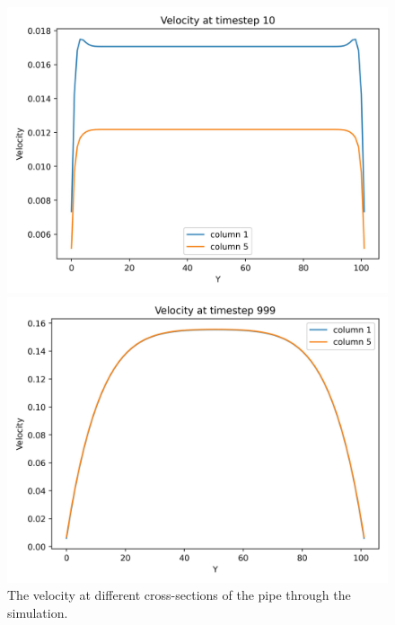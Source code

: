 \begin{figure}[H]
    \begin{minipage}{0.5\textwidth}
        \includegraphics[width=\linewidth]{graphs/PoiseuilleFlow/velocity_at_columns_for_step_10}
    \end{minipage}%
    \begin{minipage}{0.5\textwidth}
        \includegraphics[width=\linewidth]{graphs/PoiseuilleFlow/velocity_at_columns_for_step_999}
    \end{minipage}
    \caption{
        The velocity at different cross-sections of the pipe through the simulation.
    }
    \label{fig:pf-velocity-areas}
\end{figure}

